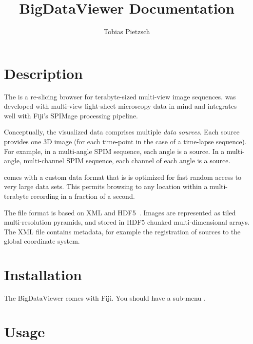 \documentclass{scrartcl}
\begin{document}
\title{BigDataViewer Documentation}
\author{Tobias Pietzsch}
\maketitle
\newpage
\tableofcontents
\newpage

\newcommand\button[1]{\textit{#1}}
\newcommand\key[1]{\texttt{#1}}
\newcommand\screenshotA[1]{\centerline{\texttt{[image: figures/\#1]}}}
\newcommand\screenshotB[1]{\centerline{\texttt{[image: figures/\#1]}}}
\newcommand\screenshotTikz[1]{\centerline{\includetikz{figures/#1}}}
\newcommand\coloredlink[1]{\textcolor{blue!75!black}{\underline{\smash{#1}}}}

\section{Description}
The \bdv is a re-slicing browser for terabyte-sized multi-view image sequences.
\Bdv was developed with multi-view light-sheet microscopy data in mind and integrates well with Fiji's SPIMage processing pipeline.

Conceptually, the visualized data comprises multiple \emph{data sources}.
Each source provides one 3D image (for each time-point in the case of a time-lapse sequence).
For example, in a multi-angle SPIM sequence, each angle is a source.
In a multi-angle, multi-channel SPIM sequence, each channel of each angle is a source.

\Bdv comes with a custom data format that is is optimized for fast random access to very large data sets.
This permits browsing to any location within a multi-terabyte recording in a fraction of a second.

The file format is based on XML and HDF5~\cite{hdf5}.
Images are represented as tiled multi-resolution pyramids, and stored in HDF5 chunked multi-dimensional arrays.
The XML file contains metadata, for example the registration of sources to the global coordinate system.

\section{Installation}
The BigDataViewer comes with Fiji.
You should have a sub-menu .

\section{Usage}
\end{document}
